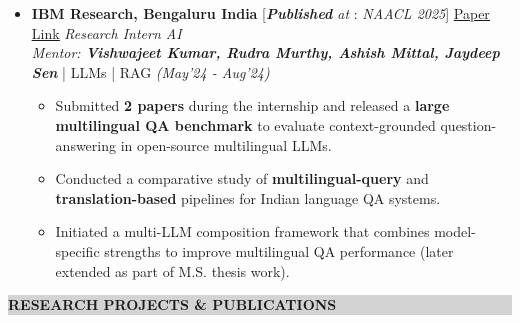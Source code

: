 \documentclass[a4paper,10pt]{article}
\newcommand{\lsep}{-0.5cm}
\newcommand{\resheading}[1]{{\small \colorbox{lightgray}{\begin{minipage}{0.975\textwidth}{\textbf{#1 \vphantom{p\^{E}}}}\end{minipage}}}}
\begin{document}
\begin{itemize}[noitemsep,nolistsep]
\item \textbf{IBM Research, Bengaluru India} \hspace{0.5cm} [\textit{\textbf{Published} at} : \textit{NAACL 2025}] \href{https://aclanthology.org/2025.findings-naacl.141/}{\underline{Paper Link}} \hfill {\emph{Research Intern AI}}\\
\emph{Mentor: \textbf{Vishwajeet Kumar, Rudra Murthy, Ashish Mittal, Jaydeep Sen}} | LLMs | RAG \hfill
\emph{(May'24 - Aug'24)}
\vspace{0.1cm}
\begin{itemize}[noitemsep,nolistsep]
    \item Submitted \textbf{2 papers} during the internship and released a \textbf{large multilingual QA benchmark} to evaluate context-grounded question-answering in open-source multilingual LLMs.
    \vspace{0.07cm}
    \item Conducted a comparative study of \textbf{multilingual-query} and \textbf{translation-based} pipelines for Indian language QA systems.
    \vspace{0.07cm}
    \item Initiated a multi-LLM composition framework that combines model-specific strengths to improve multilingual QA performance (later extended as part of M.S. thesis work).
    \vspace{0.07cm}
\end{itemize}
\end{itemize}
\vspace{0.2cm}

\resheading{\textbf{RESEARCH PROJECTS \& PUBLICATIONS}}\\[\lsep] \\[-0.4cm]
\end{document}
